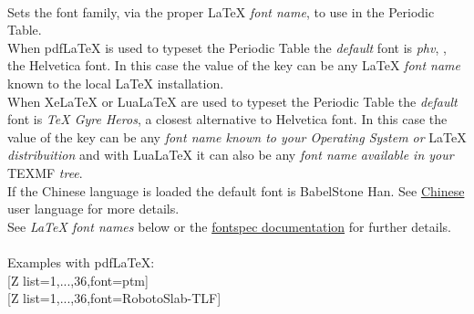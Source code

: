 {\ \\ [8pt]Sets the font family, via the proper \textrm{\LaTeX} \textit{font name}, to use in the Periodic Table.
\\ [2pt]When \textrm{pdf\LaTeX} is used to typeset the Periodic Table the \textit{default} font is \textit{phv}, \ie, the Helvetica font. In this case the value of the  key can be any \textrm{\LaTeX} \textit{font name} known to the local \textrm{\LaTeX} installation.
\\ [2pt]When \textrm{Xe\LaTeX} or \textrm{Lua\LaTeX} are used to typeset the Periodic Table the \textit{default} font is \textit{TeX Gyre Heros}, a closest alternative to Helvetica font. In this case the value of the  key can be any \textit{font name known to your Operating System or} \textrm{\LaTeX} \textit{distribuition} and with \textrm{Lua\LaTeX} it can also be any \textit{font name available in your} \textrm{TEXMF} \textit{tree}.
\\ [2pt]If the Chinese language is loaded the default font is BabelStone Han. See \hyperlink{subsec::zhLang}{Chinese} user language for more details.
\\ \hfill\scriptsize See \textit{\textrm{\LaTeX} font names} below or the \href{https://ftp.eq.uc.pt/software/TeX/macros/unicodetex/latex/fontspec/fontspec.pdf\#page=9}{fontspec documentation} for further details.\normalsize\\ \ }%
\\ [10pt]Examples with \textrm{pdf\LaTeX}:
\\ [5pt][Z list={1,...,36},font=ptm]%
\\ [10pt]\makebox[\linewidth][c]{\scalebox{.6}{\pgfPT[Z list={1,...,36},font=ptm]}}%
\newpage%
[Z list={1,...,36},font=RobotoSlab-TLF]%
\\ [10pt]\makebox[\linewidth][c]{\scalebox{.6}{\pgfPT[Z list={1,...,36},font=RobotoSlab-TLF]}}%

